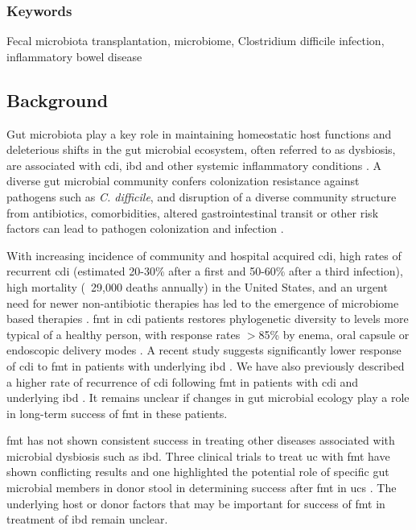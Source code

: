 \subsubsection{Keywords}
Fecal microbiota transplantation, microbiome, Clostridium difficile infection, inflammatory bowel disease

\subsection{Background}

Gut microbiota play a key role in maintaining homeostatic host functions and deleterious shifts in the gut microbial ecosystem, often referred to as dysbiosis, are associated with \gls{cdi}, \gls{ibd} and other systemic inflammatory conditions \cite{RN1477}. A diverse gut microbial community confers colonization resistance against pathogens such as \textit{C. difficile}, and disruption of a diverse community structure from antibiotics, comorbidities, altered gastrointestinal transit or other risk factors can lead to pathogen colonization and infection \cite{RN1480}.

With increasing incidence of community and hospital acquired \gls{cdi}, high rates of recurrent \gls{cdi} (estimated 20-30\% after a first and 50-60\% after a third infection), high mortality (~29,000 deaths annually) in the United States, and an urgent need for newer non-antibiotic therapies has led to the emergence of microbiome based therapies \cite{RN1478}. \Gls{fmt} in \gls{cdi} patients restores phylogenetic diversity to levels more typical of a healthy person, with response rates $>$85\% by enema, oral capsule or endoscopic delivery modes \cite{RN1484, RN1479, RN1481}. A recent study suggests significantly lower response of \gls{cdi} to \gls{fmt} in patients with underlying \gls{ibd} \cite{RN1497}. We have also previously described a higher rate of recurrence of \gls{cdi} following \gls{fmt} in patients with \gls{cdi} and underlying \gls{ibd} \cite{RN1498}. It remains unclear if changes in gut microbial ecology play a role in long-term success of \gls{fmt} in these patients.

\Gls{fmt} has not shown consistent success in treating other diseases associated with microbial dysbiosis such as \gls{ibd}. Three clinical trials to treat \gls{uc} with \gls{fmt} have shown conflicting results and one highlighted the potential role of specific gut microbial members in donor stool in determining success after \gls{fmt} in \glspl{uc} \cite{RN3982, RN1019, RN1483}.  The underlying host or donor factors that may be important for success of \gls{fmt} in treatment of \gls{ibd} remain unclear.

